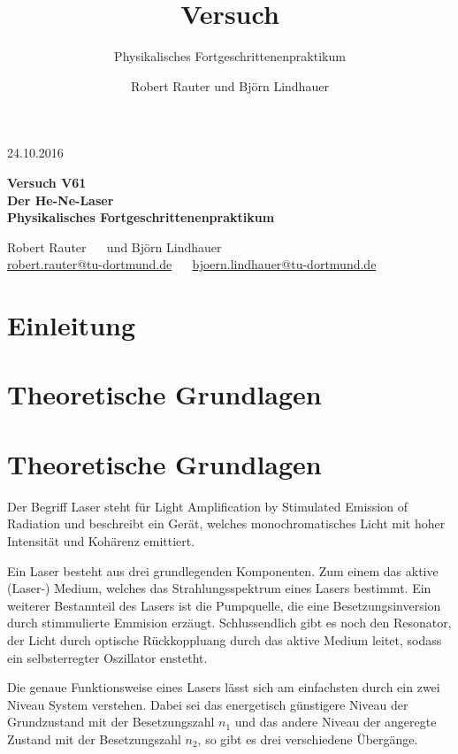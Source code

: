 \documentclass[]{scrartcl}
\title{Versuch \versuchnummer\\ \versuchname}
\subtitle{Physikalisches Fortgeschrittenenpraktikum}
\author{Robert Rauter und Björn Lindhauer}
\date{\versuchdatum}
\newcommand{\versuchnummer}{V61}
\newcommand{\versuchname}{Der He-Ne-Laser}
\newcommand{\versuchdatum}{24.10.2016}
\begin{document}
\begin{titlepage}
{\large \versuchdatum}
\vspace{7cm}
\begin{center}
\textbf{\huge Versuch \versuchnummer}\\
\vspace{0.5cm}
\textbf{\huge \versuchname}\\
\vspace{0.2cm}
\textbf{ Physikalisches Fortgeschrittenenpraktikum}\\
\vspace{9cm}

{\Large Robert Rauter \ \ \hspace{1.5cm} und \hspace{1.5cm} Björn Lindhauer}\\
{ \url{robert.rauter@tu-dortmund.de} \ \ \hspace{2cm} \url{bjoern.lindhauer@tu-dortmund.de}}
\end{center}
\end{titlepage}
\section{Einleitung}

\section{Theoretische Grundlagen}
\section{Theoretische Grundlagen}
Der Begriff Laser steht für Light Amplification by Stimulated Emission of Radiation und beschreibt ein Gerät, welches monochromatisches Licht mit hoher Intensität und Kohärenz emittiert.

Ein Laser besteht aus drei grundlegenden Komponenten. Zum einem das aktive (Laser-) Medium, welches das Strahlungsspektrum eines Lasers bestimmt.
Ein weiterer Bestannteil des Lasers ist die Pumpquelle, die eine Besetzungsinversion durch stimmulierte Emmision erzäugt. 
Schlussendlich gibt es noch den Resonator, der Licht durch optische Rückkoppluang durch das aktive Medium leitet, sodass ein selbsterregter Oszillator enstetht.

Die genaue Funktionsweise eines Lasers lässt sich am einfachsten durch ein zwei Niveau System verstehen. 
Dabei sei das energetisch günstigere Niveau der Grundzustand mit der Besetzungszahl $n_1$ und das andere Niveau der angeregte Zustand mit der Besetzungszahl $n_2$, so gibt es drei verschiedene Übergänge.
\end{document}
